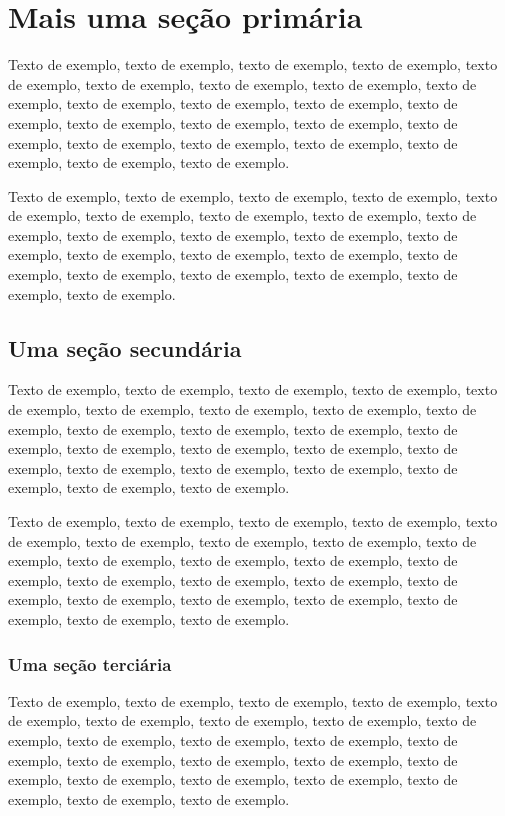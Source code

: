 \documentclass[
	12pt,				%
	oneside,			%
	a4paper,			%
	english,			%
	brazil				%
	]{abntex2ppgsi}
\begin{document}
\chapter{Mais uma seção primária}

Texto de exemplo, texto de exemplo, texto de exemplo, texto de exemplo, texto de exemplo, texto de exemplo, texto de exemplo, texto de exemplo, texto de exemplo, texto de exemplo, texto de exemplo, texto de exemplo, texto de exemplo, texto de exemplo, texto de exemplo, texto de exemplo, texto de exemplo, texto de exemplo, texto de exemplo, texto de exemplo, texto de exemplo, texto de exemplo, texto de exemplo.

Texto de exemplo, texto de exemplo, texto de exemplo, texto de exemplo, texto de exemplo, texto de exemplo, texto de exemplo, texto de exemplo, texto de exemplo, texto de exemplo, texto de exemplo, texto de exemplo, texto de exemplo, texto de exemplo, texto de exemplo, texto de exemplo, texto de exemplo, texto de exemplo, texto de exemplo, texto de exemplo, texto de exemplo, texto de exemplo.

\section{Uma seção secundária}

Texto de exemplo, texto de exemplo, texto de exemplo, texto de exemplo, texto de exemplo, texto de exemplo, texto de exemplo, texto de exemplo, texto de exemplo, texto de exemplo, texto de exemplo, texto de exemplo, texto de exemplo, texto de exemplo, texto de exemplo, texto de exemplo, texto de exemplo, texto de exemplo, texto de exemplo, texto de exemplo, texto de exemplo, texto de exemplo, texto de exemplo.

Texto de exemplo, texto de exemplo, texto de exemplo, texto de exemplo, texto de exemplo, texto de exemplo, texto de exemplo, texto de exemplo, texto de exemplo, texto de exemplo, texto de exemplo, texto de exemplo, texto de exemplo, texto de exemplo, texto de exemplo, texto de exemplo, texto de exemplo, texto de exemplo, texto de exemplo, texto de exemplo, texto de exemplo, texto de exemplo, texto de exemplo.

\subsection{Uma seção terciária}

Texto de exemplo, texto de exemplo, texto de exemplo, texto de exemplo, texto de exemplo, texto de exemplo, texto de exemplo, texto de exemplo, texto de exemplo, texto de exemplo, texto de exemplo, texto de exemplo, texto de exemplo, texto de exemplo, texto de exemplo, texto de exemplo, texto de exemplo, texto de exemplo, texto de exemplo, texto de exemplo, texto de exemplo, texto de exemplo, texto de exemplo.
\end{document}
